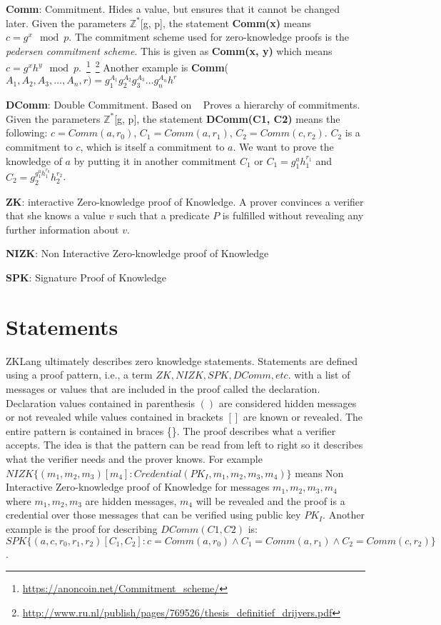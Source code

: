 \documentclass[a4paper]{article}
\begin{document}
\textbf{Comm}: Commitment. Hides a value, but ensures that it cannot be changed later. Given the parameters $\mathbb{Z^*}$[g, p], the statement \textbf{Comm(x)} means  $c=g^x\mod{p}$. The commitment scheme used for zero-knowledge proofs is the \emph{pedersen commitment scheme}. This is given as \textbf{Comm(x, y)} which means $c=g^xh^y\mod{p}$.~\footnote{\url{https://anoncoin.net/Commitment_scheme/}}~\footnote{\url{http://www.ru.nl/publish/pages/769526/thesis_definitief_drijvers.pdf}} Another example is \textbf{Comm}($A_1, A_2, A_3, \dots, A_n, r)=g_1^{A_1} g_2^{A_2} g_3^{A_3}\dots g_n^{A_n} h^r$\newline

\textbf{DComm}: Double Commitment. Based on ~\cite[Appendix]{MiersG0R13} Proves a hierarchy of commitments. Given the parameters $\mathbb{Z^*}$[g, p], the statement \textbf{DComm(C1, C2)} means the following:
$c=Comm(a, r_0)$, $C_1=Comm(a, r_1)$, $C_2=Comm(c, r_2)$. $C_2$ is a commitment to $c$, which is itself a commitment to $a$. We want to prove the knowledge of $a$ by putting it in another commitment $C_1$ or $C_1 = g_1^a h_1^{r_1}$ and $C_2 = g_2^{g_1^{a} h_1^{r_0}} h_2^{r_2}$.\newline

\textbf{ZK}: interactive Zero-knowledge proof of Knowledge. A prover convinces a verifier that she knows a value $v$ such that a predicate $P$ is fulfilled without revealing any further information about $v$.\newline

\textbf{NIZK}: Non Interactive Zero-knowledge proof of Knowledge\newline

\textbf{SPK}: Signature Proof of Knowledge\newline

\section{Statements}
ZKLang ultimately describes zero knowledge statements. Statements are defined using a proof pattern, i.e., a term $ZK, NIZK, SPK, DComm, etc.$ with a list of messages or values that are included in the proof called the declaration. Declaration values contained in parenthesis $()$ are considered hidden messages or not revealed while values contained in brackets $[]$ are known or revealed. The entire pattern is contained in braces \{\}. The proof describes what a verifier accepts. The idea is that the pattern can be read from left to right so it describes what the verifier needs and the prover knows.
For example $NIZK\{(m_1, m_2, m_3)[m_4]: Credential(PK_I, m_1, m_2, m_3, m_4)\}$ means Non Interactive Zero-knowledge proof of Knowledge for messages $m_1, m_2, m_3, m_4$ where $m_1, m_2, m_3$ are hidden messages, $m_4$ will be revealed and the proof is a credential over those messages that can be verified using public key $PK_I$. Another example is the proof for describing $DComm(C1, C2)$ is: $SPK\{(a, c, r_0, r_1, r_2)[C_1, C_2]: c=Comm(a, r_0) \wedge C_1 = Comm(a, r_1) \wedge C_2 = Comm(c, r_2)\}$. \newline



\end{document}
